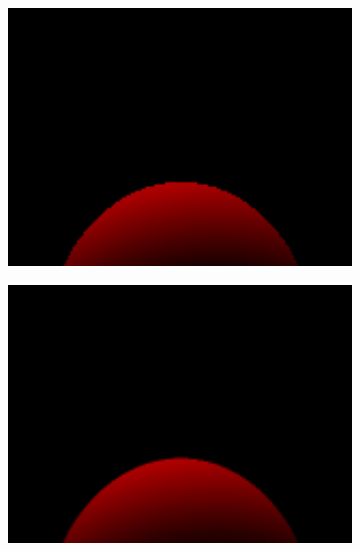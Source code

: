 \documentclass{article}
\begin{document}
\begin{figure}[hb]
  \begin{subfigure}{0.45\textwidth}
    \includegraphics[width=1\textwidth]{images/super1.png}
  \end{subfigure}
  \begin{subfigure}{0.45\textwidth}
    \includegraphics[width=1\textwidth]{images/super2.png}
  \end{subfigure}


\end{figure}
\end{document}
